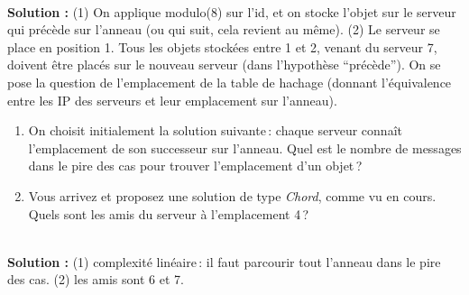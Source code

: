 \documentclass[9pt,a4paper]{article}
\newenvironment{solution}[0]{
~\\ \color{red} \textbf{Solution :}\color{black}}{%
}
\begin{document}
\begin{solution}
 (1) On applique modulo(8) sur l'id, et on stocke l'objet sur le serveur qui
précède sur l'anneau (ou qui suit, cela revient au même). (2) Le serveur se
place en position 1. Tous les objets stockées entre 1 et 2, venant du serveur 7,
doivent être placés sur le nouveau serveur (dans l'hypothèse ``précède'').
\end{solution}
   On se pose la question de l'emplacement de la table de hachage (donnant
  l'équivalence entre les IP des serveurs et leur emplacement sur l'anneau).
  
\begin{enumerate}
  \item  On
  choisit initialement la solution suivante\,: chaque serveur connaît
  l'emplacement de son successeur sur l'anneau. Quel est le nombre de messages
  dans le pire des cas pour trouver l'emplacement d'un objet\,?
  \item Vous arrivez et proposez une solution de type \textit{Chord}, comme vu
  en cours. Quels sont les amis du serveur à l'emplacement 4\,?
\end{enumerate}
\begin{solution}
 (1) complexité linéaire\,: il faut parcourir tout l'anneau dans le pire des
 cas. (2) les amis sont 6 et 7. 
\end{solution}
\end{document}
